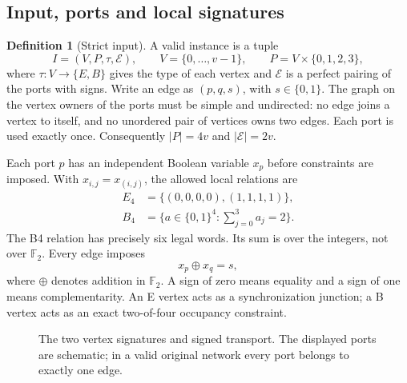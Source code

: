 \documentclass[11pt,letterpaper]{article}
\theoremstyle{definition}
\newtheorem{definition}[theorem]{Definition}
\newcommand{\bits}{\{0,1\}}
\newcommand{\Ftwo}{\mathbb F_2}
\newcommand{\abs}[1]{\lvert#1\rvert}
\begin{document}
\subsection{Input, ports and local signatures}
\begin{definition}[Strict input]
A valid instance is a tuple
\[
 I=(V,P,\tau,\mathcal E),\qquad
 V=\{0,\ldots,v-1\},\qquad P=V\times\{0,1,2,3\},
\]
where \(\tau:V\to\{E,B\}\) gives the type of each vertex and \(\mathcal E\) is a perfect pairing of the ports with signs. Write an edge as \((p,q,s)\), with \(s\in\bits\). The graph on the vertex owners of the ports must be simple and undirected: no edge joins a vertex to itself, and no unordered pair of vertices owns two edges. Each port is used exactly once. Consequently \(\abs P=4v\) and \(\abs{\mathcal E}=2v\).
\end{definition}
Each port \(p\) has an independent Boolean variable \(x_p\) before constraints are imposed. With \(x_{i,j}=x_{(i,j)}\), the allowed local relations are
\begin{align}
 E_4&=\{(0,0,0,0),(1,1,1,1)\},\label{eq:e4}\\
 B_4&=\{a\in\bits^4:\textstyle\sum_{j=0}^{3}a_j=2\}.\label{eq:b4}
\end{align}
The B4 relation has precisely six legal words. Its sum is over the integers, not over \(\Ftwo\). Every edge imposes
\begin{equation}\label{eq:edge}
 x_p\oplus x_q=s,
\end{equation}
where \(\oplus\) denotes addition in \(\Ftwo\). A sign of zero means equality and a sign of one means complementarity. An E vertex acts as a synchronization junction; a B vertex acts as an exact two-of-four occupancy constraint.

\begin{figure}[htbp]
\centering
{}
\caption{The two vertex signatures and signed transport. The displayed ports are schematic; in a valid original network every port belongs to exactly one edge.}
\label{fig:signatures}
\end{figure}
\end{document}
